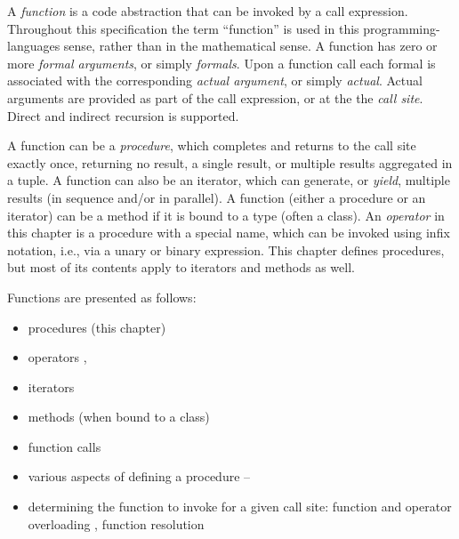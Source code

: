 \label{Functions}

A \emph{function} is a code abstraction that can be invoked by a call
expression. Throughout this specification the term ``function''
is used in this programming-languages sense, rather than
in the mathematical sense.
A function has zero or more \emph{formal arguments}, or simply
\emph{formals}. Upon a function call each formal is associated
with the corresponding \emph{actual argument}, or simply
\emph{actual}. Actual arguments are provided as part of the call
expression, or at the the \emph{call site}.
Direct and indirect recursion is supported.

A function can be a \emph{procedure}, which completes and returns to
the call site exactly once, returning no result, a single result, or
multiple results aggregated in a tuple. A function can also be an
iterator, which can generate, or \emph{yield}, multiple results (in
sequence and/or in parallel). A function (either a procedure or an
iterator) can be a method if it is bound to a type (often a
class). An \emph{operator} in this chapter is a procedure
with a special name, which can be invoked using infix notation,
i.e., via a unary or binary expression.
This chapter defines procedures, but most of its contents
apply to iterators and methods as well.

Functions are presented as follows:
\begin{itemize}
\item procedures (this chapter)
\item operators , 
\item iterators 
\item methods (when bound to a class) 
\item function calls 
\item various aspects of defining a procedure
      --
\item determining the function to invoke for a given call site:
      function and operator overloading ,
      function resolution 
\end{itemize}


